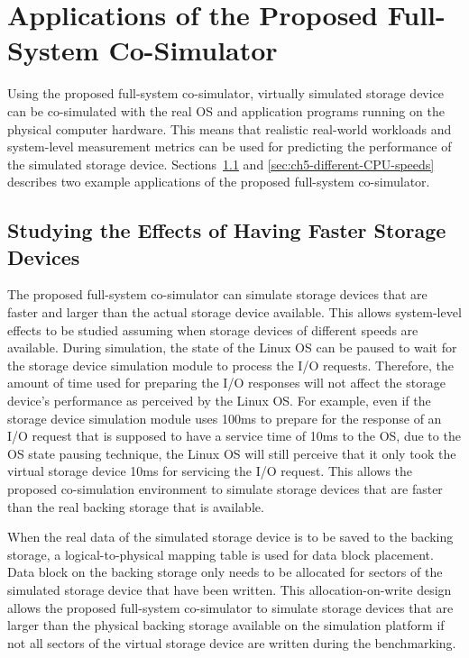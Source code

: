\section{Applications of the Proposed Full-System Co-Simulator}
\label{sec:use-case}

Using the proposed full-system co-simulator, virtually simulated storage device can be co-simulated with the real OS and application programs running on the physical computer hardware. This means that realistic real-world workloads and system-level measurement metrics can be used for predicting the performance of the simulated storage device. Sections~\ref{sec:ch5-faster-storage-devices} and \ref{sec:ch5-different-CPU-speeds} describes two example applications of the proposed full-system co-simulator.

\subsection{Studying the Effects of Having Faster Storage Devices}
\label{sec:ch5-faster-storage-devices}

The proposed full-system co-simulator can simulate storage devices that are faster and larger than the actual storage device available. This allows system-level effects to be studied assuming when storage devices of different speeds are available. During simulation, the state of the Linux OS can be paused to wait for the storage device simulation module to process the I/O requests. Therefore, the amount of time used for preparing the I/O responses will not affect the storage device's performance as perceived by the Linux OS. For example, even if the storage device simulation module uses 100\si{\milli\second} to prepare for the response of an I/O request that is supposed to have a service time of 10\si{\milli\second} to the OS, due to the OS state pausing technique, the Linux OS will still perceive that it only took the virtual storage device 10\si{\milli\second} for servicing the I/O request. This allows the proposed co-simulation environment to simulate storage devices that are faster than the real backing storage that is available.

When the real data of the simulated storage device is to be saved to the backing storage, a logical-to-physical mapping table is used for data block placement. Data block on the backing storage only needs to be allocated for sectors of the simulated storage device that have been written. This allocation-on-write design allows the proposed full-system co-simulator to simulate storage devices that are larger than the physical backing storage available on the simulation platform if not all sectors of the virtual storage device are written during the benchmarking.


